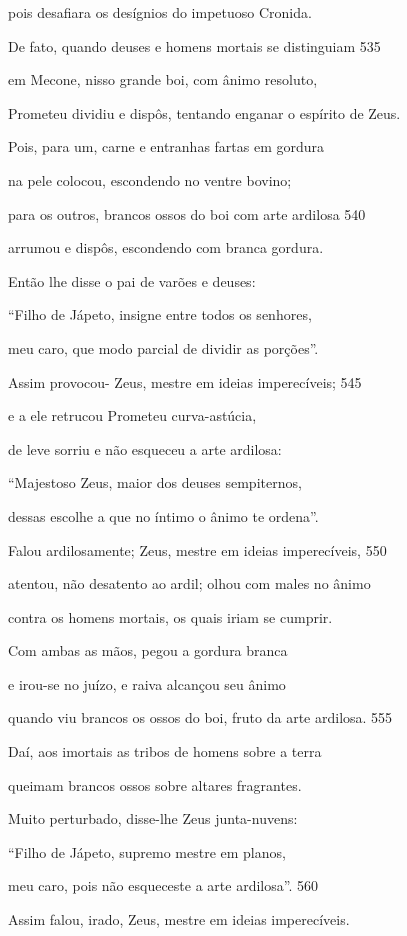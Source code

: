 pois desafiara os desígnios do impetuoso Cronida.

\quad{}De fato, quando deuses e homens mortais se distinguiam \num{535}

em Mecone, nisso grande boi, com ânimo resoluto,

Prometeu dividiu e dispôs, tentando enganar o espírito de Zeus.

Pois, para um, carne e entranhas fartas em gordura

na pele colocou, escondendo no ventre bovino;

para os outros, brancos ossos do boi com arte ardilosa \num{540}

arrumou e dispôs, escondendo com branca gordura.

\quad{}Então lhe disse o pai de varões e deuses:

``Filho de Jápeto, insigne entre todos os senhores,

meu caro, que modo parcial de dividir as porções''.

\quad{}Assim provocou- Zeus, mestre em ideias imperecíveis; \num{545}

e a ele retrucou Prometeu curva-astúcia,

de leve sorriu e não esqueceu a arte ardilosa:

``Majestoso Zeus, maior dos deuses sempiternos,

dessas escolhe a que no íntimo o ânimo te ordena''.

\quad{}Falou ardilosamente; Zeus, mestre em ideias imperecíveis, \num{550}

atentou, não desatento ao ardil; olhou com males no ânimo

contra os homens mortais, os quais iriam se cumprir.

Com ambas as mãos, pegou a gordura branca

e irou-se no juízo, e raiva alcançou seu ânimo

quando viu brancos os ossos do boi, fruto da arte ardilosa. \num{555}

Daí, aos imortais as tribos de homens sobre a terra

queimam brancos ossos sobre altares fragrantes.

\quad{}Muito perturbado, disse-lhe Zeus junta-nuvens:

``Filho de Jápeto, supremo mestre em planos,

meu caro, pois não esqueceste a arte ardilosa''. \num{560}

\quad{}Assim falou, irado, Zeus, mestre em ideias imperecíveis.

